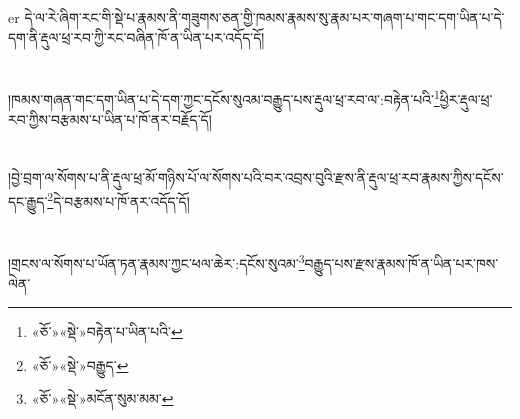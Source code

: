 er{ }དེ་ལ་རེ་ཞིག་རང་གི་སྡེ་པ་རྣམས་ནི་གཟུགས་ཅན་གྱི་ཁམས་རྣམས་སུ་རྣམ་པར་གཞག་པ་གང་དག་ཡིན་པ་དེ་དག་ནི་རྡུལ་ཕྲ་རབ་ཀྱི་རང་བཞིན་ཁོ་ན་ཡིན་པར་འདོད་དོ།\chapter{ }།ཁམས་གཞན་གང་དག་ཡིན་པ་དེ་དག་ཀྱང་དངོས་སུའམ་བརྒྱུད་པས་རྡུལ་ཕྲ་རབ་ལ་:བརྟེན་པའི་\footnote{«ཅོ་»«སྡེ་»བརྟེན་པ་ཡིན་པའི་}ཕྱིར་རྡུལ་ཕྲ་རབ་ཀྱིས་བརྩམས་པ་ཡིན་པ་ཁོ་ནར་བརྗོད་དོ།\chapter{ }།བྱེ་བྲག་ལ་སོགས་པ་ནི་རྡུལ་ཕྲ་མོ་གཉིས་པོ་ལ་སོགས་པའི་བར་འབྲས་བུའི་རྫས་ནི་རྡུལ་ཕྲ་རབ་རྣམས་ཀྱིས་དངོས་དང་རྒྱུད་\footnote{«ཅོ་»«སྡེ་»བརྒྱུད་}དེ་བརྩམས་པ་ཁོ་ནར་འདོད་དོ།\chapter{ }།གྲངས་ལ་སོགས་པ་ཡོན་ཏན་རྣམས་ཀྱང་ཕལ་ཆེར་:དངོས་སུའམ་\footnote{«ཅོ་»«སྡེ་»མངོན་སུམ་མམ་}བརྒྱུད་པས་རྫས་རྣམས་ཁོ་ན་ཡིན་པར་ཁས་ལེན་